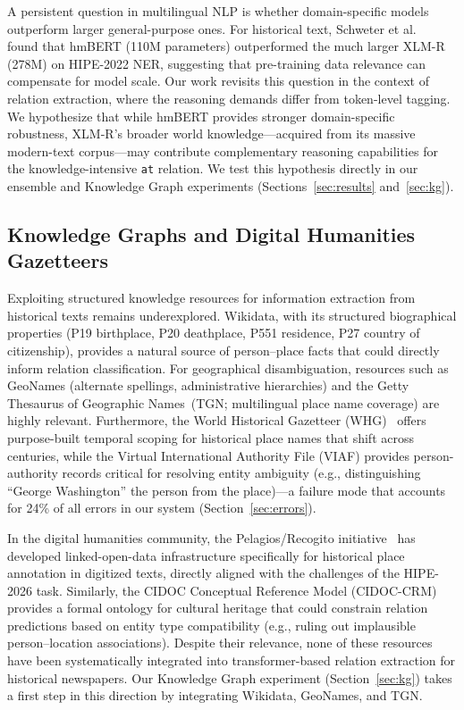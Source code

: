 \documentclass[11pt,a4paper]{article}
\begin{document}
A persistent question in multilingual NLP is whether domain-specific models outperform larger general-purpose ones. For historical text, Schweter et al.~\cite{schweter2022} found that hmBERT (110M parameters) outperformed the much larger XLM-R (278M) on HIPE-2022 NER, suggesting that pre-training data relevance can compensate for model scale. Our work revisits this question in the context of relation extraction, where the reasoning demands differ from token-level tagging. We hypothesize that while hmBERT provides stronger domain-specific robustness, XLM-R's broader world knowledge---acquired from its massive modern-text corpus---may contribute complementary reasoning capabilities for the knowledge-intensive \texttt{at} relation. We test this hypothesis directly in our ensemble and Knowledge Graph experiments (Sections~\ref{sec:results} and~\ref{sec:kg}).

\subsection{Knowledge Graphs and Digital Humanities Gazetteers}

Exploiting structured knowledge resources for information extraction from historical texts remains underexplored. Wikidata, with its structured biographical properties (P19 birthplace, P20 deathplace, P551 residence, P27 country of citizenship), provides a natural source of person--place facts that could directly inform relation classification. For geographical disambiguation, resources such as GeoNames (alternate spellings, administrative hierarchies) and the Getty Thesaurus of Geographic Names~(TGN; multilingual place name coverage) are highly relevant. Furthermore, the World Historical Gazetteer (WHG)~\cite{grossner2021} offers purpose-built temporal scoping for historical place names that shift across centuries, while the Virtual International Authority File (VIAF) provides person-authority records critical for resolving entity ambiguity (e.g., distinguishing ``George Washington'' the person from the place)---a failure mode that accounts for 24\% of all errors in our system (Section~\ref{sec:errors}).

In the digital humanities community, the Pelagios/Recogito initiative~\cite{simon2017} has developed linked-open-data infrastructure specifically for historical place annotation in digitized texts, directly aligned with the challenges of the HIPE-2026 task. Similarly, the CIDOC Conceptual Reference Model (CIDOC-CRM) provides a formal ontology for cultural heritage that could constrain relation predictions based on entity type compatibility (e.g., ruling out implausible person--location associations). Despite their relevance, none of these resources have been systematically integrated into transformer-based relation extraction for historical newspapers. Our Knowledge Graph experiment (Section~\ref{sec:kg}) takes a first step in this direction by integrating Wikidata, GeoNames, and TGN.
\end{document}
